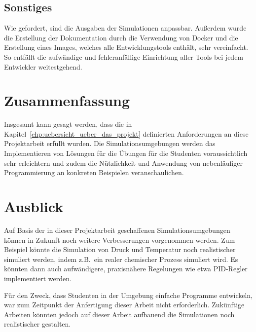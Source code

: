 \documentclass[oneside]{elaboration}
\begin{document}
\section{Sonstiges}
\label{sec:sonstiges}

Wie gefordert, sind die Ausgaben der Simulationen anpassbar. Außerdem wurde die
Erstellung der Dokumentation durch die Verwendung von Docker und die Erstellung
eines Images, welches alle Entwicklungstools enthält, sehr vereinfacht. So
entfällt die aufwändige und fehleranfällige Einrichtung aller Tools bei jedem
Entwickler weitestgehend.

\chapter{Zusammenfassung}
\label{chp:zusammenfassung}

Insgesamt kann gesagt werden, dass die in
Kapitel~\ref{chp:uebersicht_ueber_das_projekt} definierten Anforderungen an
diese Projektarbeit erfüllt wurden. Die Simulationsumgebungen werden das
Implementieren von Lösungen für die Übungen für die Studenten voraussichtlich
sehr erleichtern und zudem die Nützlichkeit und Anwendung von nebenläufiger
Programmierung an konkreten Beispielen veranschaulichen.

\chapter{Ausblick}
\label{chp:ausblick}

Auf Basis der in dieser Projektarbeit geschaffenen Simulationsumgebungen können
in Zukunft noch weitere Verbesserungen vorgenommen werden. Zum Beispiel könnte
die Simulation von Druck und Temperatur noch realistischer simuliert werden,
indem z.B.\ ein realer chemischer Prozess simuliert wird. Es könnten dann auch
aufwändigere, praxisnähere Regelungen wie etwa PID-Regler implementiert werden.

Für den Zweck, dass Studenten in der Umgebung einfache Programme entwickeln, war
zum Zeitpunkt der Anfertigung dieser Arbeit nicht erforderlich. Zukünftige
Arbeiten könnten jedoch auf dieser Arbeit aufbauend die Simulationen noch
realistischer gestalten.


\clearpage

\printbibliography
\end{document}
